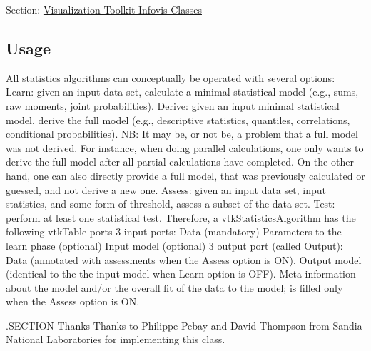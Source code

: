 Section\-: \hyperlink{sec_vtkinfovis}{Visualization Toolkit Infovis Classes} \hypertarget{vtkwidgets_vtkxyplotwidget_Usage}{}\subsection{Usage}\label{vtkwidgets_vtkxyplotwidget_Usage}
All statistics algorithms can conceptually be operated with several options\-: Learn\-: given an input data set, calculate a minimal statistical model (e.\-g., sums, raw moments, joint probabilities). Derive\-: given an input minimal statistical model, derive the full model (e.\-g., descriptive statistics, quantiles, correlations, conditional probabilities). N\-B\-: It may be, or not be, a problem that a full model was not derived. For instance, when doing parallel calculations, one only wants to derive the full model after all partial calculations have completed. On the other hand, one can also directly provide a full model, that was previously calculated or guessed, and not derive a new one. Assess\-: given an input data set, input statistics, and some form of threshold, assess a subset of the data set. Test\-: perform at least one statistical test. Therefore, a vtk\-Statistics\-Algorithm has the following vtk\-Table ports 3 input ports\-: Data (mandatory) Parameters to the learn phase (optional) Input model (optional) 3 output port (called Output)\-: Data (annotated with assessments when the Assess option is O\-N). Output model (identical to the the input model when Learn option is O\-F\-F). Meta information about the model and/or the overall fit of the data to the model; is filled only when the Assess option is O\-N.

.S\-E\-C\-T\-I\-O\-N Thanks Thanks to Philippe Pebay and David Thompson from Sandia National Laboratories for implementing this class.

